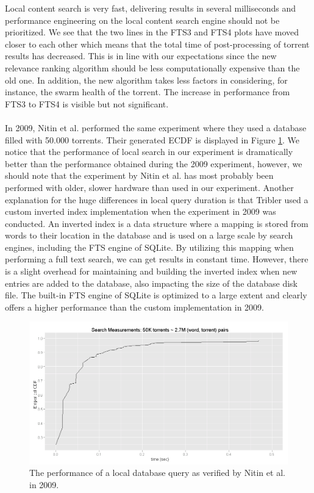\noindent Local content search is very fast, delivering results in several milliseconds and performance engineering on the local content search engine should not be prioritized. We see that the two lines in the FTS3 and FTS4 plots have moved closer to each other which means that the total time of post-processing of torrent results has decreased. This is in line with our expectations since the new relevance ranking algorithm should be less computationally expensive than the old one. In addition, the new algorithm takes less factors in considering, for instance, the swarm health of the torrent. The increase in performance from FTS3 to FTS4 is visible but not significant.\\\\
In 2009, Nitin et al. performed the same experiment where they used a database filled with 50.000 torrents. Their generated ECDF is displayed in Figure \ref{fig:local-search-nitin}. We notice that the performance of local search in our experiment is dramatically better than the performance obtained during the 2009 experiment, however, we should note that the experiment by Nitin et al. has most probably been performed with older, slower hardware than used in our experiment. Another explanation for the huge differences in local query duration is that Tribler used a custom inverted index implementation when the experiment in 2009 was conducted. An inverted index is a data structure where a mapping is stored from words to their location in the database and is used on a large scale by search engines, including the FTS engine of SQLite. By utilizing this mapping when performing a full text search, we can get results in constant time. However, there is a slight overhead for maintaining and building the inverted index when new entries are added to the database, also impacting the size of the database disk file. The built-in FTS engine of SQLite is optimized to a large extent and clearly offers a higher performance than the custom implementation in 2009.

\begin{figure}[h!]
	\centering
	\includegraphics[width=1.0\columnwidth]{images/experiments/nitin_local_search}
	\caption{The performance of a local database query as verified by Nitin et al. in 2009.}
	\label{fig:local-search-nitin}
\end{figure}


